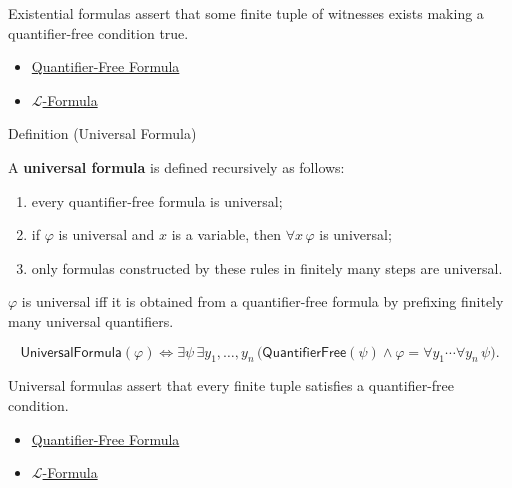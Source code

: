 \begin{remark*}[Interpretation]
Existential formulas assert that some finite tuple of witnesses exists making
a quantifier-free condition true.
\end{remark*}

\begin{dependencies}
\begin{itemize}
  \item \hyperref[def:quantifier-free-formula]{Quantifier-Free Formula}
  \item \hyperref[def:l-formula]{$\mathcal{L}$-Formula}
\end{itemize}
\end{dependencies}

\begin{definitionbox}{Definition (Universal Formula)}
\begin{definition}\label{def:universal-formula}
A \textbf{universal formula} is defined recursively as follows:
\begin{enumerate}
  \item every quantifier-free formula is universal;
  \item if $\varphi$ is universal and $x$ is a variable, then
        $\forall x\,\varphi$ is universal;
  \item only formulas constructed by these rules in finitely many steps are
        universal.
\end{enumerate}
\end{definition}
\end{definitionbox}

\begin{remark*}
$\varphi$ is universal iff it is obtained from a quantifier-free formula by
prefixing finitely many universal quantifiers.
\end{remark*}

\begin{remark*}
\[
\mathsf{UniversalFormula}(\varphi)
\Longleftrightarrow
\exists\psi\,\exists y_1,\ldots,y_n\,
\bigl(\mathsf{QuantifierFree}(\psi)
\land \varphi=\forall y_1\cdots\forall y_n\,\psi\bigr).
\]
\end{remark*}

\begin{remark*}[Interpretation]
Universal formulas assert that every finite tuple satisfies a quantifier-free
condition.
\end{remark*}

\begin{dependencies}
\begin{itemize}
  \item \hyperref[def:quantifier-free-formula]{Quantifier-Free Formula}
  \item \hyperref[def:l-formula]{$\mathcal{L}$-Formula}
\end{itemize}
\end{dependencies}

